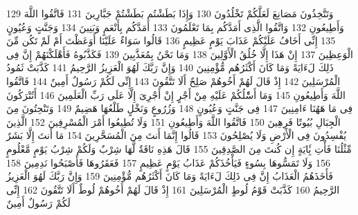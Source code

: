 \documentclass[20pt,a4paper]{article}
\begin{document}
{\tiny\colorbox{cl_aya}{129}} وَتَتَّخِذُونَ مَصَانِعَ لَعَلَّكُمْ تَخْلُدُونَ
{\tiny\colorbox{cl_aya}{130}} وَإِذَا بَطَشْتُم بَطَشْتُمْ جَبَّارِينَ
{\tiny\colorbox{cl_aya}{131}} فَاتَّقُوا اللَّهَ وَأَطِيعُونِ
{\tiny\colorbox{cl_aya}{132}} وَاتَّقُوا الَّذِى أَمَدَّكُم بِمَا تَعْلَمُونَ
{\tiny\colorbox{cl_aya}{133}} أَمَدَّكُم بِأَنْعَمٍ وَبَنِينَ
{\tiny\colorbox{cl_aya}{134}} وَجَنَّتٍ وَعُيُونٍ
{\tiny\colorbox{cl_aya}{135}} إِنِّى أَخَافُ عَلَيْكُمْ عَذَابَ يَوْمٍ عَظِيمٍ
{\tiny\colorbox{cl_aya}{136}} قَالُوا سَوَاءٌ عَلَيْنَا أَوَعَظْتَ أَمْ لَمْ تَكُن مِّنَ الْوَعِظِينَ
{\tiny\colorbox{cl_aya}{137}} إِنْ هَذَا إِلَّا خُلُقُ الْأَوَّلِينَ
{\tiny\colorbox{cl_aya}{138}} وَمَا نَحْنُ بِمُعَذَّبِينَ
{\tiny\colorbox{cl_aya}{139}} فَكَذَّبُوهُ فَأَهْلَكْنَهُمْ إِنَّ فِى ذَلِكَ لَءَايَةً وَمَا كَانَ أَكْثَرُهُم مُّؤْمِنِينَ
{\tiny\colorbox{cl_aya}{140}} وَإِنَّ رَبَّكَ لَهُوَ الْعَزِيزُ الرَّحِيمُ
{\tiny\colorbox{cl_aya}{141}} كَذَّبَتْ ثَمُودُ الْمُرْسَلِينَ
{\tiny\colorbox{cl_aya}{142}} إِذْ قَالَ لَهُمْ أَخُوهُمْ صَلِحٌ أَلَا تَتَّقُونَ
{\tiny\colorbox{cl_aya}{143}} إِنِّى لَكُمْ رَسُولٌ أَمِينٌ
{\tiny\colorbox{cl_aya}{144}} فَاتَّقُوا اللَّهَ وَأَطِيعُونِ
{\tiny\colorbox{cl_aya}{145}} وَمَا أَسَْٔلُكُمْ عَلَيْهِ مِنْ أَجْرٍ إِنْ أَجْرِىَ إِلَّا عَلَى رَبِّ الْعَلَمِينَ
{\tiny\colorbox{cl_aya}{146}} أَتُتْرَكُونَ فِى مَا هَهُنَا ءَامِنِينَ
{\tiny\colorbox{cl_aya}{147}} فِى جَنَّتٍ وَعُيُونٍ
{\tiny\colorbox{cl_aya}{148}} وَزُرُوعٍ وَنَخْلٍ طَلْعُهَا هَضِيمٌ
{\tiny\colorbox{cl_aya}{149}} وَتَنْحِتُونَ مِنَ الْجِبَالِ بُيُوتًا فَرِهِينَ
{\tiny\colorbox{cl_aya}{150}} فَاتَّقُوا اللَّهَ وَأَطِيعُونِ
{\tiny\colorbox{cl_aya}{151}} وَلَا تُطِيعُوا أَمْرَ الْمُسْرِفِينَ
{\tiny\colorbox{cl_aya}{152}} الَّذِينَ يُفْسِدُونَ فِى الْأَرْضِ وَلَا يُصْلِحُونَ
{\tiny\colorbox{cl_aya}{153}} قَالُوا إِنَّمَا أَنتَ مِنَ الْمُسَحَّرِينَ
{\tiny\colorbox{cl_aya}{154}} مَا أَنتَ إِلَّا بَشَرٌ مِّثْلُنَا فَأْتِ بَِٔايَةٍ إِن كُنتَ مِنَ الصَّدِقِينَ
{\tiny\colorbox{cl_aya}{155}} قَالَ هَذِهِ نَاقَةٌ لَّهَا شِرْبٌ وَلَكُمْ شِرْبُ يَوْمٍ مَّعْلُومٍ
{\tiny\colorbox{cl_aya}{156}} وَلَا تَمَسُّوهَا بِسُوءٍ فَيَأْخُذَكُمْ عَذَابُ يَوْمٍ عَظِيمٍ
{\tiny\colorbox{cl_aya}{157}} فَعَقَرُوهَا فَأَصْبَحُوا نَدِمِينَ
{\tiny\colorbox{cl_aya}{158}} فَأَخَذَهُمُ الْعَذَابُ إِنَّ فِى ذَلِكَ لَءَايَةً وَمَا كَانَ أَكْثَرُهُم مُّؤْمِنِينَ
{\tiny\colorbox{cl_aya}{159}} وَإِنَّ رَبَّكَ لَهُوَ الْعَزِيزُ الرَّحِيمُ
{\tiny\colorbox{cl_aya}{160}} كَذَّبَتْ قَوْمُ لُوطٍ الْمُرْسَلِينَ
{\tiny\colorbox{cl_aya}{161}} إِذْ قَالَ لَهُمْ أَخُوهُمْ لُوطٌ أَلَا تَتَّقُونَ
{\tiny\colorbox{cl_aya}{162}} إِنِّى لَكُمْ رَسُولٌ أَمِينٌ
\end{document}
